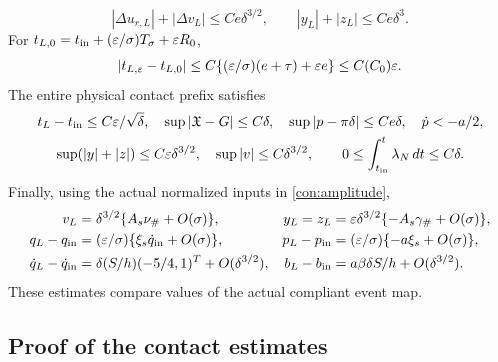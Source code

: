 \begin{theorem}
\begin{equation}
 |\Delta u_{r,L}|+|\Delta v_L|\le Ce\delta^{3/2},\qquad
 |y_L|+|z_L|\le Ce\delta^3.
 \label{con:physical-errors}
\end{equation}
For $t_{L,0}=t_{\rm in}+(\varepsilon/\sigma)T_\sigma+\varepsilon R_0$,
\begin{equation}
 |t_{L,\varepsilon}-t_{L,0}|
 \le C\{(\varepsilon/\sigma)(e+\tau)+\varepsilon e\}\le C(C_0)\varepsilon.
 \label{con:release-clock}
\end{equation}
The entire physical contact prefix satisfies
\begin{equation}
 \begin{gathered}
 t_L-t_{\rm in}\le C\varepsilon/\sqrt\delta,\quad
 \sup|\mathfrak X-G|\le C\delta,\quad
 \sup|p-\pi\delta|\le Ce\delta,\quad \dot p<-a/2,\\
 \sup(|y|+|z|)\le C\varepsilon\delta^{3/2},\quad
 \sup|v|\le C\delta^{3/2},\qquad
 0\le\int_{t_{\rm in}}^t\lambda_N\,dt\le C\delta.
 \end{gathered}
 \label{con:prefix}
\end{equation}
Finally, using the actual normalized inputs in \eqref{con:amplitude},
\begin{equation}
 \begin{aligned}
 v_L&=\delta^{3/2}\{A_s\nu_\#+O(\sigma)\},&
 y_L=z_L&=\varepsilon\delta^{3/2}\{-A_s\gamma_\#+O(\sigma)\},\\
 q_L-q_{\rm in}&=(\varepsilon/\sigma)
       \{\xi_s\dot q_{\rm in}+O(\sigma)\},&
 p_L-p_{\rm in}&=(\varepsilon/\sigma)\{-a\xi_s+O(\sigma)\},\\
 \dot q_L-\dot q_{\rm in}&=\delta(S/h)(-5/4,1)^T+O(\delta^{3/2}),&
 b_L-b_{\rm in}&=a\beta\delta S/h+O(\delta^{3/2}).
 \end{aligned}
 \label{con:leading-data}
\end{equation}
These estimates compare values of the actual compliant event map.
\end{theorem}

\subsection{Proof of the contact estimates}

